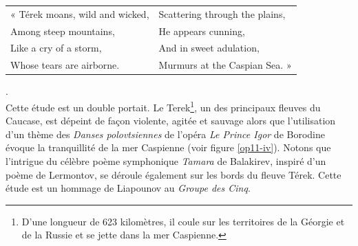 \begin{tabular}{ll}
\hspace{-3.9mm}« Térek moans, wild and wicked,
&
Scattering through the plains,
\\
Among steep mountains,
&
He appears cunning,
\\
Like a cry of a storm,
&
And in sweet adulation,
\\
Whose tears are airborne.
&
Murmurs at the Caspian Sea. »
\end{tabular}.\\

Cette étude est un double portait. Le Terek\footnote{D'une longueur de 623 kilomètres, il coule sur les territoires de la Géorgie et de la Russie et se jette dans la mer Caspienne.}, un des principaux fleuves du Caucase, est dépeint de façon violente, agitée et sauvage alors que l'utilisation d'un thème des \emph{Danses polovtsiennes} de l'opéra \emph{Le Prince Igor} de Borodine évoque la tranquillité de la mer Caspienne  (voir figure \ref{op11-iv}). Notons que l'intrigue du célèbre poème symphonique \emph{Tamara} de Balakirev, inspiré d'un poème de Lermontov, se déroule également sur les bords du fleuve Térek. Cette étude est un hommage de Liapounov au \emph{Groupe des Cinq}.

